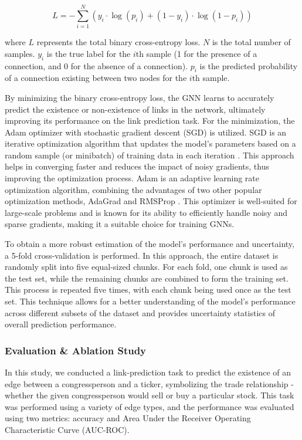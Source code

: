 \documentclass[15pt,letterpaper]{article}
\begin{document}
$$L=-\sum_{i=1}^N\left(y_i \cdot \log \left(p_i\right)+\left(1-y_i\right) \cdot \log \left(1-p_i\right)\right)$$

where $L$ represents the total binary cross-entropy loss.
$N$ is the total number of samples.
$y_i$ is the true label for the $i$th sample (1 for the presence of a connection, and 0 for the absence of a connection).
$p_i$ is the predicted probability of a connection existing between two nodes for the $i$th sample.

By minimizing the binary cross-entropy loss, the GNN learns to accurately predict the existence or non-existence of links in the network, ultimately improving its performance on the link prediction task.
For the minimization, the Adam optimizer \citep{kingma2014adam} with stochastic gradient descent (SGD) is utilized. SGD is an iterative optimization algorithm that updates the model's parameters based on a random sample (or minibatch) of training data in each iteration \citep{AMARI1993185}. This approach helps in converging faster and reduces the impact of noisy gradients, thus improving the optimization process. Adam is an adaptive learning rate optimization algorithm, combining the advantages of two other popular optimization methods, AdaGrad and RMSProp \citep{kingma2014adam}. This optimizer is well-suited for large-scale problems and is known for its ability to efficiently handle noisy and sparse gradients, making it a suitable choice for training GNNs.

To obtain a more robust estimation of the model's performance and uncertainty, a 5-fold cross-validation \citep{elem} is performed. In this approach, the entire dataset is randomly split into five equal-sized chunks. For each fold, one chunk is used as the test set, while the remaining chunks are combined to form the training set. This process is repeated five times, with each chunk being used once as the test set. This technique allows for a better understanding of the model's performance across different subsets of the dataset and provides uncertainty statistics of overall prediction performance.

\subsubsection{Evaluation \& Ablation Study}

In this study, we conducted a link-prediction \citep{lp} task to predict the existence of an edge between a congressperson and a ticker, symbolizing the trade relationship - whether the given congressperson would sell or buy a particular stock. This task was performed using a variety of edge types, and the performance was evaluated using two metrics: accuracy and Area Under the Receiver Operating Characteristic Curve (AUC-ROC).
\end{document}
